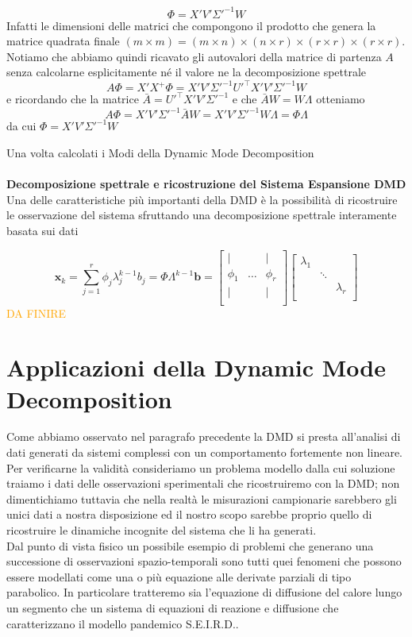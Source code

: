 \documentclass[11pt]{article}
\begin{document}
\begin{itemize}
$$ \Phi = X'V'\Sigma'^{-1}W $$ 
Infatti le dimensioni delle matrici che compongono il prodotto che genera la matrice quadrata finale 
$(m \times m) = (m \times n) \times (n \times r) \times (r \times r) \times (r \times r)$.\\
Notiamo che abbiamo quindi ricavato gli autovalori della matrice di partenza $A$ senza calcolarne esplicitamente né il valore ne la decomposizione spettrale
$$A \Phi = X'X^+ \Phi = X' V' \Sigma'^{-1} U'^\top X'V'\Sigma'^{-1}W $$ e ricordando che la matrice $\bar{A} =  U'^\top X' V' \Sigma'^{-1}$ e che $\bar{A} W = W \Lambda$    otteniamo
$$ A \Phi = X'V'\Sigma'^{-1} \bar{A}  W = X'V'\Sigma'^{-1} W \Lambda  = \Phi \Lambda $$
da cui
$\Phi = X'V'\Sigma'^{-1}W $ \\
\end{itemize}


Una volta calcolati i Modi della Dynamic Mode Decomposition  \\
\\
\textbf{Decomposizione spettrale e ricostruzione del Sistema Espansione DMD}\\
Una delle caratteristiche più importanti della DMD è la possibilità di ricostruire le osservazione del sistema sfruttando una decomposizione spettrale interamente basata sui dati


\[
\mathbf{x}_k=\sum_{j=1}^r \phi_j \lambda_j^{k-1}b_j= \Phi\Lambda^{k-1}\mathbf{b}=\begin{bmatrix}
| & & | \\
\phi_1 & \dots & \phi_r \\
| & & | \\
\end{bmatrix} \begin{bmatrix}
\lambda_1 && \\
& \ddots &\\
&& \lambda_r \\
\end{bmatrix}
\]
\textcolor{orange}{DA FINIRE}
\newpage
\section{Applicazioni della Dynamic Mode Decomposition}
Come abbiamo osservato nel paragrafo precedente la DMD si presta all'analisi di dati generati da sistemi complessi con un comportamento fortemente non lineare. Per verificarne la validità consideriamo un problema modello dalla cui soluzione traiamo i dati delle osservazioni sperimentali che ricostruiremo con la DMD; non dimentichiamo tuttavia che nella realtà le misurazioni campionarie sarebbero gli unici dati a nostra disposizione ed il nostro scopo sarebbe proprio quello di ricostruire le dinamiche incognite del sistema che li ha generati.\\ 
Dal punto di vista fisico un possibile esempio di problemi che generano una successione di osservazioni spazio-temporali sono tutti quei fenomeni che possono essere modellati come una o più equazione alle derivate parziali di tipo parabolico. 
In particolare tratteremo sia l'equazione di diffusione del calore lungo un segmento che un sistema di equazioni di reazione e diffusione che caratterizzano il modello pandemico S.E.I.R.D.. 
\end{document}
